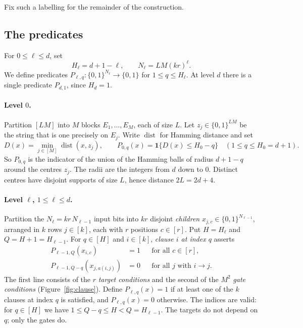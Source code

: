 \documentclass[11pt]{article}
\theoremstyle{definition}
\theoremstyle{remark}
\begin{document}
Fix such a labelling for the remainder of the construction.

\subsection{The predicates}
For \(0\le\ell\le d\), set
\[
 H_\ell=d+1-\ell,\qquad N_\ell=LM(kr)^\ell.
\]
We define predicates \(P_{\ell,q}:\{0,1\}^{N_\ell}\to\{0,1\}\) for
\(1\le q\le H_\ell\). At level \(d\) there is a single predicate \(P_{d,1}\),
since \(H_d=1\).

\paragraph{Level \(0\).}
Partition \([LM]\) into \(M\) blocks \(E_1,\ldots,E_M\), each of
size \(L\). Let \(z_j\in\{0,1\}^{LM}\) be the string that is one precisely on
\(E_j\). Write \(\operatorname{dist}\) for Hamming distance and set
\[
 D(x)=\min_{j\in[M]}\operatorname{dist}(x,z_j),\qquad
 P_{0,q}(x)=\mathbf1\{D(x)\le H_0-q\}\quad(1\le q\le H_0=d+1).
\]
So \(P_{0,q}\) is the indicator of the union of the Hamming balls of radius
\(d+1-q\) around the centres \(z_j\). The radii are the integers from \(d\)
down to \(0\). Distinct centres have disjoint supports of size \(L\), hence
distance \(2L=2d+4\).

\paragraph{Level \(\ell\), \(1\le\ell\le d\).}
Partition the \(N_\ell=kr\,N_{\ell-1}\) input bits into \(kr\) disjoint
\emph{children} \(x_{j,c}\in\{0,1\}^{N_{\ell-1}}\), arranged in \(k\) rows
\(j\in[k]\), each with \(r\) positions \(c\in[r]\).
Put \(H=H_\ell\) and \(Q=H+1=H_{\ell-1}\).
For \(q\in[H]\) and \(i\in[k]\), \emph{clause \(i\) at index \(q\)} asserts
\begin{equation}\label{eq:predicate-definition}
 \begin{aligned}
 P_{\ell-1,Q}(x_{i,c})&=1 &&\text{for all }c\in[r],\\
 P_{\ell-1,Q-q}(x_{j,a(i,j)})&=0 &&\text{for all }j\text{ with }i\to j.
 \end{aligned}
\end{equation}
The first line consists of the \(r\) \emph{target conditions} and the second of the
\(M^2\) \emph{gate conditions} (Figure~\ref{fig:clause}). Define
\(P_{\ell,q}(x)=1\) if at least one of the \(k\) clauses at index \(q\) is
satisfied, and \(P_{\ell,q}(x)=0\) otherwise. The indices are valid: for
\(q\in[H]\) we have \(1\le Q-q\le H<Q=H_{\ell-1}\). The targets do not depend
on \(q\); only the gates do.
\end{document}

